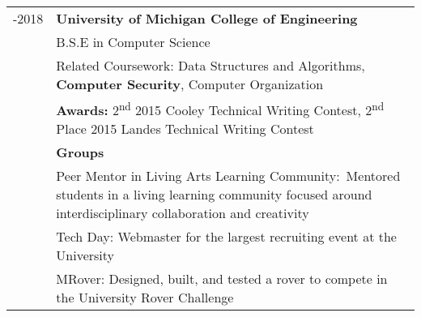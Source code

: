 %
%
%
\newcommand{\nextitem}{\par\hspace*{\labelsep}\faAngleRight\hspace*{\labelsep}}

\begin{tabular}{>{\small}r>{\small}p{14cm}}
 \parbox{\datebox}{-2018} & \textbf{University of Michigan College of Engineering} \\
 & B.S.E in Computer Science \\
 & Related Coursework: Data Structures and Algorithms, \textbf{Computer Security}, Computer Organization\\
 & \textbf{Awards:} 2\textsuperscript{nd} 2015 Cooley Technical Writing Contest, 2\textsuperscript{nd} Place 2015 Landes Technical Writing Contest\\
 & \textbf{Groups} \\
 & \nextitem Peer Mentor in Living Arts Learning Community$\colon$ Mentored students in a living learning \newline \hspace*{5mm}community focused around interdisciplinary collaboration and creativity \\
 & \nextitem Tech Day: Webmaster for the largest recruiting event at the University \\
 & \nextitem MRover: Designed, built, and tested a rover to compete in the University Rover Challenge\\
\end{tabular}